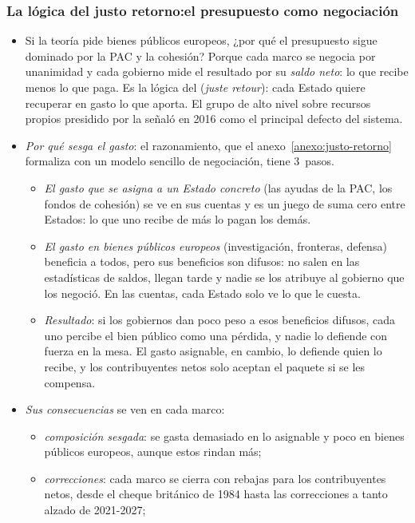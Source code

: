 \documentclass[11pt]{article}
\begin{document}
\subsubsection{La lógica del justo retorno:\cortetitulo el presupuesto como negociación}\label{sec:justo-retorno}

\begin{itemize}
\item Si la teoría pide bienes públicos europeos, ¿por qué el presupuesto sigue dominado por la PAC y la cohesión? Porque cada marco se negocia por unanimidad y cada gobierno mide el resultado por su \emph{saldo neto}: lo que recibe menos lo que paga. Es la lógica del  (\emph{juste retour}): cada Estado quiere recuperar en gasto lo que aporta. El grupo de alto nivel sobre recursos propios presidido por  la señaló en 2016 como el principal defecto del sistema\nocite{Monti2016Futuro}.
\item \emph{Por qué sesga el gasto}: el razonamiento, que el anexo~\ref{anexo:justo-retorno} formaliza con un modelo sencillo de negociación, tiene 3~pasos.
  \begin{itemize}
  \item \emph{El gasto que se asigna a un Estado concreto} (las ayudas de la PAC, los fondos de cohesión) se ve en sus cuentas y es un juego de suma cero entre Estados: lo que uno recibe de más lo pagan los demás.
  \item \emph{El gasto en bienes públicos europeos} (investigación, fronteras, defensa) beneficia a todos, pero sus beneficios son difusos: no salen en las estadísticas de saldos, llegan tarde y nadie se los atribuye al gobierno que los negoció. En las cuentas, cada Estado solo ve lo que le cuesta.
  \item \emph{Resultado}: si los gobiernos dan poco peso a esos beneficios difusos, cada uno percibe el bien público como una pérdida, y nadie lo defiende con fuerza en la mesa. El gasto asignable, en cambio, lo defiende quien lo recibe, y los contribuyentes netos solo aceptan el paquete si se les compensa.
  \end{itemize}
\item \emph{Sus consecuencias} se ven en cada marco:
  \begin{itemize}
  \item \emph{composición sesgada}: se gasta demasiado en lo asignable y poco en bienes públicos europeos, aunque estos rindan más;
  \item \emph{correcciones}: cada marco se cierra con rebajas para los contribuyentes netos, desde el cheque británico de 1984 hasta las correcciones a tanto alzado de 2021-2027;

\end{itemize}
\end{itemize}
\end{document}

